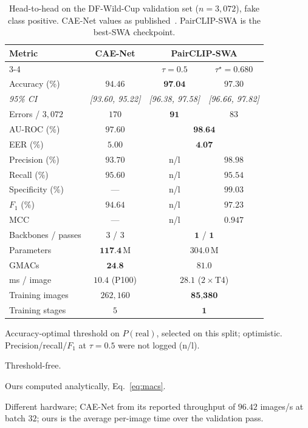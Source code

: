 \documentclass[10pt,journal]{IEEEtran}
\newcommand{\best}[1]{\textbf{#1}}
\begin{document}
\begin{table}[!tb]
\caption{Head-to-head on the DF-Wild-Cup validation set ($n=3{,}072$), fake
class positive. CAE-Net values as published~\cite{bhattacharjee2026caenet}.
PairCLIP-SWA is the best-SWA checkpoint.}
\label{tab:head2head}
\centering
\footnotesize
\setlength{\tabcolsep}{2.6pt}
\begin{threeparttable}
\begin{tabular}{@{}lccc@{}}
\toprule
Metric & CAE-Net & \multicolumn{2}{c}{PairCLIP-SWA} \\
\cmidrule(l){3-4}
 & & $\tau=0.5$ & $\tau^\star=0.680$\tnote{a} \\
\midrule
Accuracy (\%)             & $94.46$ & $\best{97.04}$ & $97.30$ \\
\emph{95\% CI}            & \emph{[93.60, 95.22]} & \emph{[96.38, 97.58]} & \emph{[96.66, 97.82]} \\
Errors / $3{,}072$         & $170$   & $\best{91}$ & $83$ \\
AU-ROC (\%)\tnote{b}      & $97.60$ & \multicolumn{2}{c}{$\best{98.64}$} \\
EER (\%)\tnote{b}         & $5.00$  & \multicolumn{2}{c}{$\best{4.07}$} \\
Precision (\%)            & $93.70$ & n/l & $98.98$ \\
Recall (\%)               & $95.60$ & n/l & $95.54$ \\
Specificity (\%)          & ---     & n/l & $99.03$ \\
$F_1$ (\%)                & $94.64$ & n/l & $97.23$ \\
MCC                       & ---     & n/l & $0.947$ \\
\midrule
Backbones / passes        & $3$ / $3$ & \multicolumn{2}{c}{$\best{1}$ / $\best{1}$} \\
Parameters                & $\best{117.4}$\,M & \multicolumn{2}{c}{$304.0$\,M} \\
GMACs\tnote{c}            & $\best{24.8}$ & \multicolumn{2}{c}{$81.0$} \\
ms / image\tnote{d}       & $10.4$ (P100) & \multicolumn{2}{c}{$28.1$ ($2\times$T4)} \\
Training images           & $262{,}160$ & \multicolumn{2}{c}{$\best{85{,}380}$} \\
Training stages           & $5$ & \multicolumn{2}{c}{$\best{1}$} \\
\bottomrule
\end{tabular}
\begin{tablenotes}[flushleft]\footnotesize
\item[a] Accuracy-optimal threshold on $P(\text{real})$, selected on this split;
optimistic. Precision/recall/$F_1$ at $\tau=0.5$ were not logged (n/l).
\item[b] Threshold-free.
\item[c] Ours computed analytically, Eq.~\eqref{eq:macs}.
\item[d] Different hardware; CAE-Net from its reported throughput of
$96.42$ images/s at batch $32$; ours is the average per-image time over the
validation pass.
\end{tablenotes}
\end{threeparttable}
\end{table}
\end{document}
